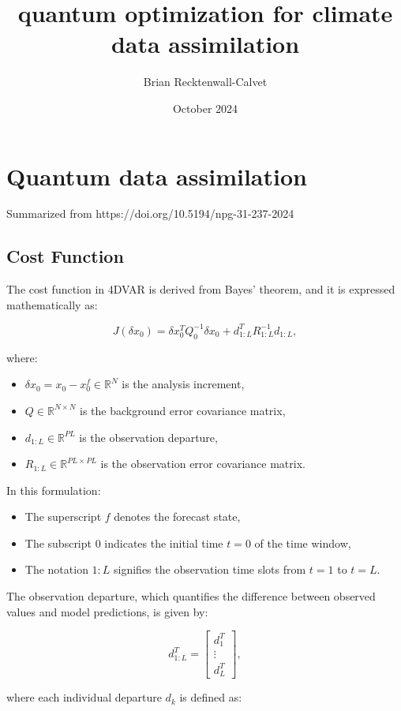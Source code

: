 \documentclass{article}
\title{quantum optimization for climate data assimilation}
\author{Brian Recktenwall-Calvet}
\date{October 2024}
\begin{document}
\maketitle
\section{Quantum data assimilation}
Summarized from https://doi.org/10.5194/npg-31-237-2024
\subsection{Cost Function}

The cost function in 4DVAR is derived from Bayes’ theorem, and it is expressed mathematically as:

\[
J (\delta x_0) = \delta x_0^T Q_0^{-1} \delta x_0 + d_{1:L}^T R_{1:L}^{-1} d_{1:L},
\]

where:
\begin{itemize}
    \item \( \delta x_0 = x_0 - x^f_0 \in \mathbb{R}^N \) is the analysis increment,
    \item \( Q \in \mathbb{R}^{N \times N} \) is the background error covariance matrix,
    \item \( d_{1:L} \in \mathbb{R}^{PL} \) is the observation departure,
    \item \( R_{1:L} \in \mathbb{R}^{PL \times PL} \) is the observation error covariance matrix.
\end{itemize}

In this formulation:
\begin{itemize}
    \item The superscript \( f \) denotes the forecast state,
    \item The subscript \( 0 \) indicates the initial time \( t = 0 \) of the time window,
    \item The notation \( 1:L \) signifies the observation time slots from \( t = 1 \) to \( t = L \).
\end{itemize}

The observation departure, which quantifies the difference between observed values and model predictions, is given by:

\[
d_{1:L}^T = \begin{bmatrix}
d_1^T \\
\vdots \\
d_L^T
\end{bmatrix},
\]

where each individual departure \( d_k \) is defined as:
\end{document}
